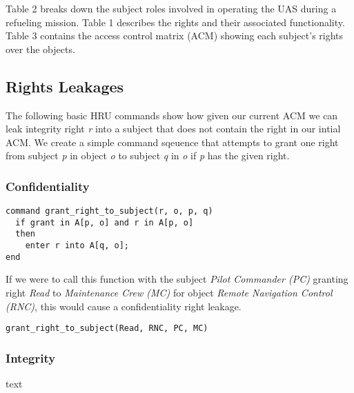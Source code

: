 \documentclass[10pt,journal,compsoc]{IEEEtran}
\begin{document}
Table 2 breaks down the subject roles involved in operating the UAS during a refueling mission. Table 1 describes the rights and their associated functionality. Table 3 contains the access control matrix (ACM) showing each subject's rights over the objects.

\subsection{Rights Leakages}

The following basic HRU commands show how given our current ACM we can leak integrity right \textit{r} into a subject that does not contain the right in our intial ACM.
We create a simple command sqeuence that attempts to grant one right from subject \textit{p} in object \textit{o} to subject \textit{q} in \textit{o} if \textit{p} has the given right.

\subsubsection{Confidentiality}

\begin{lstlisting}
command grant_right_to_subject(r, o, p, q)
  if grant in A[p, o] and r in A[p, o]
  then
    enter r into A[q, o];
end
\end{lstlisting}

If we were to call this function with the subject \textit{Pilot Commander (PC)} granting right \textit{Read} to \textit{Maintenance Crew (MC)} for object \textit{Remote Navigation Control (RNC)}, this would cause a confidentiality right leakage. 


\begin{lstlisting}
grant_right_to_subject(Read, RNC, PC, MC)
\end{lstlisting}

\subsubsection{Integrity}

text


\end{document}

